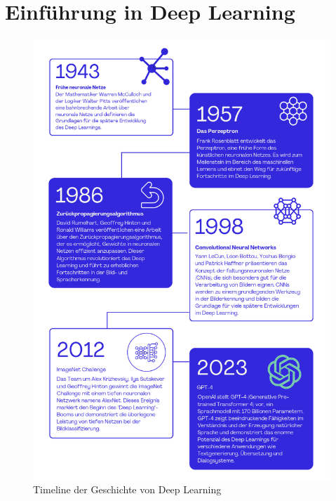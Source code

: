 \chapter{Einführung in Deep Learning}

    \begin{figure}[h]
        \centering
        \includegraphics[width=\textwidth]{img/timeline.png}
        \caption{Timeline der Geschichte von Deep Learning}
        \label{fig:deeplearning_timeline}
    \end{figure}

